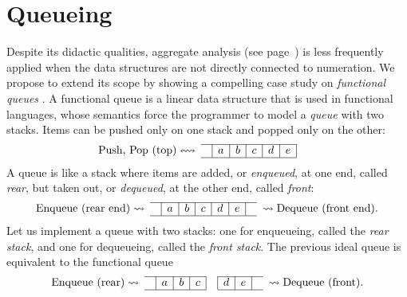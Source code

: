 \section{Queueing}
\label{sec:queueing}

Despite its didactic qualities, aggregate analysis (see
page~\pageref{par:aggregate}) is less frequently applied when the data
structures are not directly connected to numeration. We propose to
extend its scope by showing a compelling case study on
\emph{functional queues}
\citep{Burton_1982,Okasaki_1995,Okasaki_1998b}. A functional queue is
a linear data structure that is used in functional languages, whose
semantics force the programmer to model a \emph{queue} with two
stacks. Items can be pushed only on one stack and popped only on the
other:
\begin{equation*}
\begin{array}{@{}l@{}r@{\;}cc|c|c|c|c|c|cc@{\;}l@{}}
\cline{4-9}
& \text{Push, Pop (top)} 
& \leftrightsquigarrow & & a & b & c & d & e &&&\\
\cline{4-9}
\end{array}
\end{equation*}
A queue is like a stack where items are added, or \emph{enqueued}, at
one end, called \emph{rear}, but taken out, or \emph{dequeued}, at the
other end, called \emph{front}:
\begin{equation*}
\begin{array}{@{}l@{}r@{\;}cc|c|c|c|c|c|cc@{\;}l@{}}
\cline{4-10}
& \text{Enqueue (rear end)} 
                & \rightsquigarrow & & a & b & c & d & e &
& \rightsquigarrow & \text{Dequeue (front end).}\\
\cline{4-10}
\end{array}
\end{equation*}
Let us implement a queue with two stacks: one for enqueueing, called
the \emph{rear stack}, and one for dequeueing, called the \emph{front
  stack}. The previous ideal queue is equivalent to the
functional queue
\begin{equation*}
\begin{array}{r@{\;}cc|c|c|c|c|c|c|cc@{\;}l}
  \cline{3-6}\cline{8-10}
  \text{Enqueue (rear)} & \rightsquigarrow & & a & b & c & & d & e & &
  \rightsquigarrow & \text{Dequeue (front).}\\
  \cline{3-6}\cline{8-10}
\end{array}
\end{equation*}
